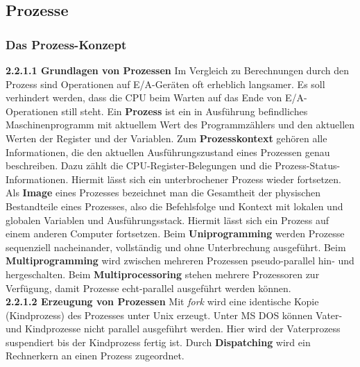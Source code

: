 \documentclass{article}
\begin{document}
\subsection{Prozesse}
\subsubsection{Das Prozess-Konzept}
    \textbf{2.2.1.1 Grundlagen von Prozessen}\newline
    Im Vergleich zu Berechnungen durch den Prozess sind Operationen auf E/A-Geräten oft erheblich langsamer. Es soll verhindert werden, dass die CPU beim Warten auf das Ende von E/A-Operationen still steht.\newline
    Ein \textbf{Prozess} ist ein in Ausführung befindliches Maschinenprogramm mit aktuellem Wert des Programmzählers und den aktuellen Werten der Register und der Variablen.\newline
    Zum \textbf{Prozesskontext} gehören alle Informationen, die den aktuellen Ausführungszustand eines Prozessen genau beschreiben. Dazu zählt die CPU-Register-Belegungen und die Prozess-Status-Informationen. Hiermit lässt sich ein unterbrochener Prozess wieder fortsetzen.\newline
    Als \textbf{Image} eines Prozesses bezeichnet man die Gesamtheit der physischen Bestandteile eines Prozesses, also die Befehlsfolge und Kontext mit lokalen und globalen Variablen und Ausführungsstack. Hiermit lässt sich ein Prozess auf einem anderen Computer fortsetzen.\newline
    Beim \textbf{Uniprogramming} werden Prozesse sequenziell nacheinander, vollständig und ohne Unterbrechung ausgeführt.\newline
    Beim \textbf{Multiprogramming} wird zwischen mehreren Prozessen pseudo-parallel hin- und hergeschalten.\newline
    Beim \textbf{Multiprocessoring} stehen mehrere Prozessoren zur Verfügung, damit Prozesse echt-parallel ausgeführt werden können.\newline
    \\
    \textbf{2.2.1.2 Erzeugung von Prozessen}\newline
    Mit \textit{fork} wird eine identische Kopie (Kindprozess) des Prozesses unter Unix erzeugt. Unter MS DOS können Vater- und Kindprozesse nicht parallel ausgeführt werden. Hier wird der Vaterprozess suspendiert bis der Kindprozess fertig ist.\newline
    Durch \textbf{Dispatching} wird ein Rechnerkern an einen Prozess zugeordnet.\newline
\end{document}
